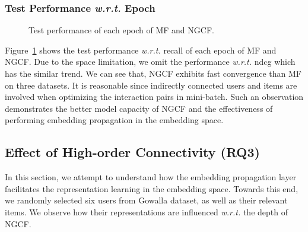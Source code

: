 \documentclass[sigconf]{acmart}
\newcommand{\wrt}{\emph{w.r.t. }}
\theoremstyle{definition}
\begin{document}
\subsubsection{\textbf{Test Performance \wrt Epoch}}

\begin{figure}[t]
\centering
{}
\vspace{-10pt}
\caption{Test performance of each epoch of MF and NGCF.}
\label{fig:trend}\vspace{-15pt}
\end{figure}


Figure~\ref{fig:trend} shows the test performance \wrt recall of each epoch of MF and NGCF. Due to the space limitation, we omit the performance \wrt ndcg which has the similar trend.
We can see that, NGCF exhibits fast convergence than MF on three datasets.
It is reasonable since indirectly connected users and items are involved when optimizing the interaction pairs in mini-batch.
Such an observation demonstrates the better model capacity of NGCF and the effectiveness of performing embedding propagation in the embedding space.


\subsection{Effect of High-order Connectivity (RQ3)}



In this section, we attempt to understand how the embedding propagation layer facilitates the representation learning in the embedding space.
Towards this end, we randomly selected six users from Gowalla dataset, as well as their relevant items.
We observe how their representations are influenced \wrt the depth of NGCF.
\end{document}
